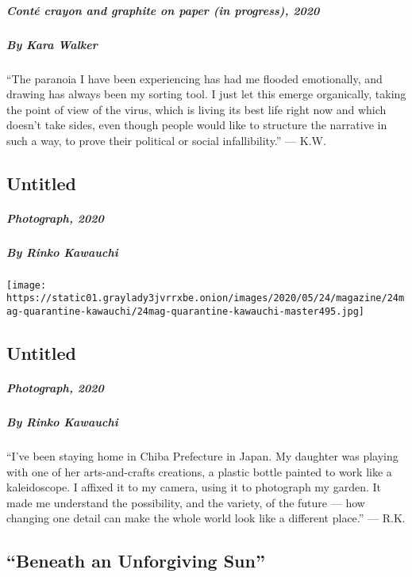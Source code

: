 \hypertarget{contuxe9-crayon-and-graphite-on-paper-in-progress-2020-1}{%
\subparagraph{Conté crayon and graphite on paper (in progress),
2020}\label{contuxe9-crayon-and-graphite-on-paper-in-progress-2020-1}}

\hypertarget{by-kara-walker-1}{%
\subparagraph{By Kara Walker}\label{by-kara-walker-1}}

``The paranoia I have been experiencing has had me flooded emotionally,
and drawing has always been my sorting tool. I just let this emerge
organically, taking the point of view of the virus, which is living its
best life right now and which doesn't take sides, even though people
would like to structure the narrative in such a way, to prove their
political or social infallibility.'' --- K.W.

\hypertarget{untitled}{%
\subsection{Untitled}\label{untitled}}

\hypertarget{photograph-2020-1}{%
\subparagraph{Photograph, 2020}\label{photograph-2020-1}}

\hypertarget{by-rinko-kawauchi}{%
\subparagraph{By Rinko Kawauchi}\label{by-rinko-kawauchi}}

\texttt{[image: https://static01.graylady3jvrrxbe.onion/images/2020/05/24/magazine/24mag-quarantine-kawauchi/24mag-quarantine-kawauchi-master495.jpg]}

\hypertarget{untitled-1}{%
\subsection{Untitled}\label{untitled-1}}

\hypertarget{photograph-2020-2}{%
\subparagraph{Photograph, 2020}\label{photograph-2020-2}}

\hypertarget{by-rinko-kawauchi-1}{%
\subparagraph{By Rinko Kawauchi}\label{by-rinko-kawauchi-1}}

``I've been staying home in Chiba Prefecture in Japan. My daughter was
playing with one of her arts-and-crafts creations, a plastic bottle
painted to work like a kaleidoscope. I affixed it to my camera, using it
to photograph my garden. It made me understand the possibility, and the
variety, of the future --- how changing one detail can make the whole
world look like a different place.'' --- R.K.

\hypertarget{beneath-an-unforgiving-sun}{%
\subsection{``Beneath an Unforgiving
Sun''}\label{beneath-an-unforgiving-sun}}

